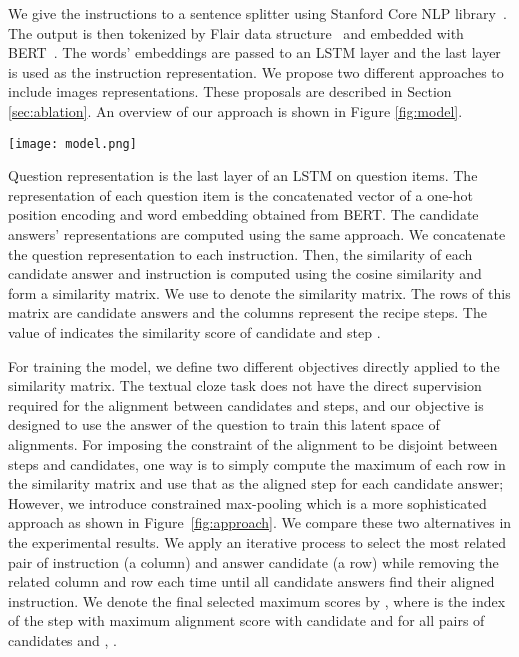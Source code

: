 \documentclass[11pt,a4paper]{article}
\begin{document}
We give the instructions to a sentence splitter using Stanford Core NLP library~\cite{manning2014stanford}. The output is then tokenized by Flair data structure~\cite{akbik2018coling} and embedded with BERT~\cite{devlin-etal-2019-bert}. The words' embeddings are passed to an LSTM layer and the last layer is used as the instruction representation. We propose two different approaches to include images representations. These proposals are described in Section \ref{sec:ablation}. An overview of our approach is shown in Figure \ref{fig:model}.
\begin{figure*}[t]
    \centering
    \texttt{[image: model.png]}
    \caption{An overview of proposed model}
    \label{fig:model}
\end{figure*}

Question representation is the last layer of an LSTM on question items. The representation of each question item is the concatenated vector of a one-hot position encoding and word embedding obtained from BERT. The candidate answers' representations are computed using the same approach. We concatenate the question representation to each instruction. Then, the similarity of each candidate answer and instruction is computed using the cosine similarity and form a similarity matrix. We use  to denote the similarity matrix. The rows of this matrix are candidate answers and the columns represent the recipe steps. The value of  indicates the similarity score of candidate  and step .

For training the model, we define two different objectives directly applied to the similarity matrix. The textual cloze task does not have the direct supervision required for the alignment between candidates and steps, and our objective is designed to use the answer of the question to train this latent space of alignments. For imposing the constraint of the alignment to be disjoint between steps and candidates, one way is to simply compute the maximum of each row in the similarity matrix and use that as the aligned step for each candidate answer; However, we introduce constrained max-pooling which is a more sophisticated approach as shown in Figure~\ref{fig:approach}. We compare these two alternatives in the experimental results. We apply an iterative process to select the most related pair of instruction (a column) and answer candidate (a row) while removing the related column and row each time until all candidate answers find their aligned instruction. We denote the final selected maximum scores by , where  is the index of the step with maximum alignment score with candidate and for all pairs of candidates  and , .
\end{document}
